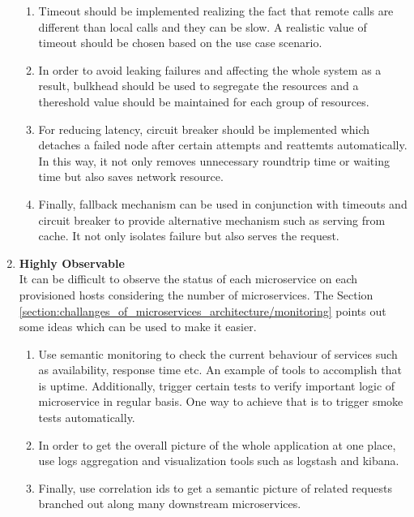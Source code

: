 \begin{enumerate}
\begin{enumerate}
\item Timeout should be implemented realizing the fact that remote calls are different than local calls and they can be slow. A realistic value of timeout should be chosen based on the use case scenario.
\item In order to avoid leaking failures and affecting the whole system as a result, bulkhead should be used to segregate the resources and a thereshold value should be maintained for each group of resources.
\item For reducing latency, circuit breaker should be implemented which detaches a failed node after certain attempts and reattemts automatically. In this way, it not only removes unnecessary roundtrip time or waiting time but also saves network resource.
\item Finally, fallback mechanism can be used in conjunction with timeouts and circuit breaker to provide alternative mechanism such as serving from cache. It not only isolates failure but also serves the request.
\end{enumerate}
\item \textbf{Highly Observable} \\
It can be difficult to observe the status of each microservice on each provisioned hosts considering the number of microservices. The Section \ref{section:challanges_of_microservices_architecture/monitoring} points out some ideas which can be used to make it easier.
\begin{enumerate}
\item Use semantic monitoring to check the current behaviour of services such as availability, response time etc. An example of tools to accomplish that is uptime. Additionally, trigger certain tests to verify important logic of microservice in regular basis. One way to achieve that is to trigger smoke tests automatically.
\item In order to get the overall picture of the whole application at one place, use logs aggregation and visualization tools such as logstash and kibana.
\item Finally, use correlation ids to get a semantic picture of related requests branched out along many downstream microservices.
\end{enumerate}
\end{enumerate}